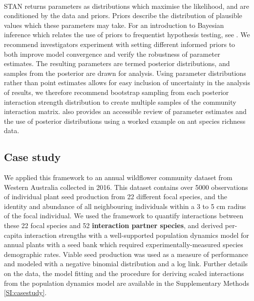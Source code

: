 \documentclass[a4,12pt]{article}
\begin{document}
        \paragraph{}
        STAN returns parameters as distributions which maximise the likelihood, and are conditioned by the data and priors. Priors describe the distribution of plausible values which these parameters may take. For an introduction to Bayesian inference which relates the use of priors to frequentist hypothesis testing, see \textcite{Ellison1996}. We recommend investigators experiment with setting different informed priors to both improve model convergence and verify the robustness of parameter estimates. The resulting parameters are termed posterior distributions, and samples from the posterior are drawn for analysis. Using parameter distributions rather than point estimates allows for easy inclusion of uncertainty in the analysis of results, we therefore recommend bootstrap sampling from each posterior interaction strength distribution to create multiple samples of the community interaction matrix. \textcite{Ellison2004} also provides an accessible review of parameter estimates and the use of posterior distributions using a worked example on ant species richness data.


    \subsection{Case study}

      
        We applied this framework to an annual wildflower community dataset from Western Australia collected in 2016. This dataset contains over 5000 observations of individual plant seed production from 22 different focal species, and the identity and abundance of all neighbouring individuals within a 3 to 5 cm radius of the focal individual. We used the framework to quantify interactions between these 22 focal species and 52 \textbf{interaction partner species}, and derived per-capita interaction strengths with a well-supported population dynamics model for annual plants with a seed bank \parencite{Levine2009, Bimler2018} which required experimentally-measured species demographic rates. Viable seed production was used as a measure of performance and modeled with a negative binomial distribution and a log link.
        Further details on the data, the model fitting and the procedure for deriving scaled interactions from the population dynamics model are available in the Supplementary Methods \ref{SI:casestudy}.
\end{document}
